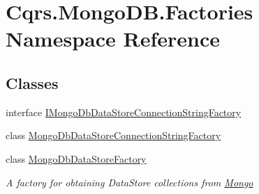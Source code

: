 \hypertarget{namespaceCqrs_1_1MongoDB_1_1Factories}{}\section{Cqrs.\+Mongo\+D\+B.\+Factories Namespace Reference}
\label{namespaceCqrs_1_1MongoDB_1_1Factories}
\subsection*{Classes}
\begin{DoxyCompactItemize}
\item 
interface \hyperlink{interfaceCqrs_1_1MongoDB_1_1Factories_1_1IMongoDbDataStoreConnectionStringFactory}{I\+Mongo\+Db\+Data\+Store\+Connection\+String\+Factory}
\item 
class \hyperlink{classCqrs_1_1MongoDB_1_1Factories_1_1MongoDbDataStoreConnectionStringFactory}{Mongo\+Db\+Data\+Store\+Connection\+String\+Factory}
\item 
class \hyperlink{classCqrs_1_1MongoDB_1_1Factories_1_1MongoDbDataStoreFactory}{Mongo\+Db\+Data\+Store\+Factory}
\begin{DoxyCompactList}\small\item\em A factory for obtaining Data\+Store collections from \hyperlink{namespaceCqrs_1_1Mongo}{Mongo} \end{DoxyCompactList}\end{DoxyCompactItemize}
